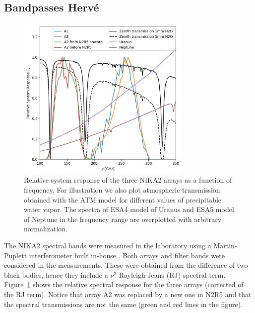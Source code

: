 


\subsection{Bandpasses {\color{blue} Herv\'e} }


\begin{figure}[ht!] %
\begin{center}
\includegraphics[width=0.75\textwidth]{Figures/SpectralBands/bandpasses_nika2.png}
\caption[NIKA2 transmission]{Relative system response of the three NIKA2 arrays as a
  function of frequency. For illustration we also plot atmospheric transmission obtained with the ATM model 
 \cite{ATM} for different values of precipitable water vapor. The spectra of ESA4 model of Uranus and ESA5 model of Neptune \cite{ESAmodel} in the frequency range are overplotted with arbitrary normalization.} 
 \label{spectralband1}
\end{center}
\end{figure}

 

The NIKA2 spectral bands were measured in the laboratory using a
Martin-Puplett interferometer built in-house \cite{durand}.  Both
arrays and filter bands were considered in the measurements. These
were obtained from the difference of two black bodies, hence they
include a $\nu^2$ Rayleigh-Jeans (RJ) spectral term.
Figure~\ref{spectralband1} shows the relative spectral response for
the three arrays (corrected of the RJ term).  Notice that array A2 was
replaced by a new one in N2R5 and that the spectral transmissions are
not the same (green and red lines in the figure).

